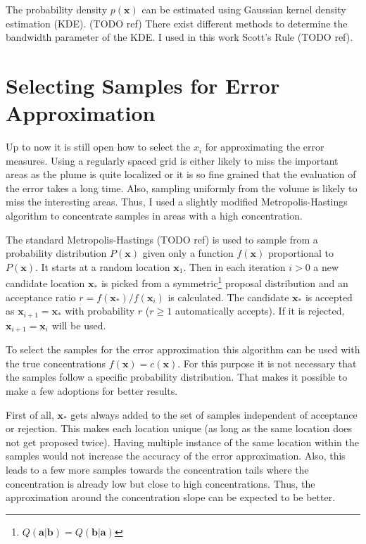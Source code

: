 \documentclass[11pt,a4paper,twoside,BCOR=15mm]{scrreprt}
\newcommand{\vc}[1]{\bm{#1}}
\begin{document}
The probability density $p(\vc x)$ can be estimated using Gaussian kernel 
density estimation (KDE). (TODO ref) There exist different methods to determine 
the bandwidth parameter of the KDE\@. I used in this work Scott's Rule (TODO 
ref).

\section{Selecting Samples for Error Approximation}
Up to now it is still open how to select the $x_i$ for approximating the error 
measures.  Using a regularly spaced grid is either likely to miss the important 
areas as the plume is quite localized or it is so fine grained that the 
evaluation of the error takes a long time. Also, sampling uniformly from the 
volume is likely to miss the interesting areas.  Thus, I used a slightly 
modified Metropolis-Hastings algorithm to concentrate samples in areas with 
a high concentration.

The standard Metropolis-Hastings (TODO ref) is used to sample from a probability 
distribution $P(\vc x)$ given only a function $f(\vc x)$ proportional to $P(\vc 
x)$. It starts at a random location $\vc x_1$.  Then in each iteration $i > 0$ 
a new candidate location $\vc x_*$ is picked from a symmetric\footnote{$Q(\vc 
    a | \vc b) = Q(\vc b | \vc a)$} proposal distribution and an acceptance 
ratio $r = f(\vc x_*) / f(\vc x_i)$ is calculated. The candidate $\vc x_*$ is 
accepted as $\vc x_{i + 1} = \vc x_*$ with probability $r$ ($r \geq 1$ 
automatically accepts). If it is rejected, $\vc x_{i + 1} = \vc x_i$ will be 
used.

To select the samples for the error approximation this algorithm can be used 
with the true concentrations $f(\vc x) = c(\vc x)$. For this purpose it is not 
necessary that the samples follow a specific probability distribution. That 
makes it possible to make a few adoptions for better results.

First of all, $\vc x_*$ gets always added to the set of samples independent of 
acceptance or rejection.  This makes each location unique (as long as the same 
location does not get proposed twice).  Having multiple instance of the same 
location within the samples would not increase the accuracy of the error 
approximation. Also, this leads to a few more samples towards the concentration 
tails where the concentration is already low but close to high concentrations.  
Thus, the approximation around the concentration slope can be expected to be 
better.
\end{document}
